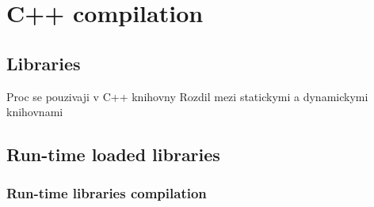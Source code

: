\chapter*{C++ compilation}

\section*{Libraries}
Proc se pouzivaji v C++ knihovny
Rozdil mezi statickymi a dynamickymi knihovnami


\section*{Run-time loaded libraries}


\subsection*{Run-time libraries compilation}

